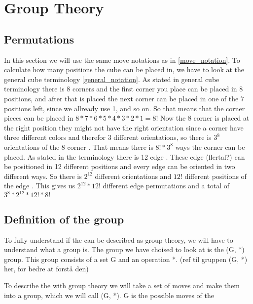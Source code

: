 \chapter{Group Theory}


\section{Permutations}
In this section we will use the same move notations as in \ref{move_notation}.
To calculate how many positions the cube can be placed in, we have to look at the general cube terminology \ref{general_notation}.
As stated in general cube terminology there is 8 corners \cpiece{} and the first corner you place can be placed in 8 positions, and after that is placed the next corner \cpiece{} can be placed in one of the 7 positions left, since we allready use 1, and so on. So that means that the corner pieces can be placed in $8*7*6*5*4*3*2*1=8!$ Now the 8 corner \cpiece{} is placed at the right position they might not have the right orientation since a corner \cpiece{} have three different colors and therefor 3 different orientations, so there is $3^8$ orientations of the 8 corner \cpiece{}. That means there is $8!*3^8$ ways the corner \cpiece{} can be placed. As stated in the terminology there is 12 edge \cpiece{}. These edge \cpiece{} (flertal?) can be positioned in 12 different positions and every edge \cpiece{} can be oriented in two different ways. So there is $2^12$ different orientations and $12!$ different positions of the edge \cpiece{}. This gives us $2^{12}*12!$ different edge permutations and a total of $3^8*2^{12}*12!*8!$

\section{Definition of the \rubik{} group}
To fully understand if the \rubik{} can be described as group theory, we will have to understand what a group is.
The group we have choised to look at is the (G, *) group. This group consists of a set G and an operation *. (ref til gruppen (G, *) her, for bedre at forstå den)

To describe the \rubik{} with group theory we will take a set of moves and make them into a group, which we will call (G, *). G is the possible moves of the \rubik{}


\myTail{
}
%